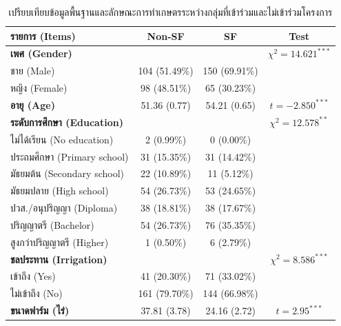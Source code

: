 \begin{table}[ht]
\centering
\small
\setlength{\tabcolsep}{4pt}
\renewcommand{\arraystretch}{1.1}
\caption{เปรียบเทียบข้อมูลพื้นฐานและลักษณะการทำเกษตรระหว่างกลุ่มที่เข้าร่วมและไม่เข้าร่วมโครงการ}
\label{tab:descriptive}

\begin{tabular}{lccc}
\hline
\textbf{รายการ (Items)} & \textbf{Non-SF} & \textbf{SF} & \textbf{Test} \\
\hline

\textbf{เพศ (Gender)} & & & $\chi^2 = 14.621^{***}$ \\
ชาย (Male) & 104 (51.49\%) & 150 (69.91\%) & \\
หญิง (Female) & 98 (48.51\%) & 65 (30.23\%) & \\

\textbf{อายุ (Age)} & 51.36 (0.77) & 54.21 (0.65) & $t = -2.850^{***}$ \\

\textbf{ระดับการศึกษา (Education)} & & & $\chi^2 = 12.578^{**}$ \\
ไม่ได้เรียน (No education) & 2 (0.99\%) & 0 (0.00\%) & \\
ประถมศึกษา (Primary school) & 31 (15.35\%) & 31 (14.42\%) & \\
มัธยมต้น (Secondary school) & 22 (10.89\%) & 11 (5.12\%) & \\
มัธยมปลาย (High school) & 54 (26.73\%) & 53 (24.65\%) & \\
ปวส./อนุปริญญา (Diploma) & 38 (18.81\%) & 38 (17.67\%) & \\
ปริญญาตรี (Bachelor) & 54 (26.73\%) & 76 (35.35\%) & \\
สูงกว่าปริญญาตรี (Higher) & 1 (0.50\%) & 6 (2.79\%) & \\

\textbf{ชลประทาน (Irrigation)} & & & $\chi^2 = 8.586^{***}$ \\
เข้าถึง (Yes) & 41 (20.30\%) & 71 (33.02\%) & \\
ไม่เข้าถึง (No) & 161 (79.70\%) & 144 (66.98\%) & \\

\textbf{ขนาดฟาร์ม (ไร่)} & 37.81 (3.78) & 24.16 (2.72) & $t = 2.95^{***}$ \\

\hline
\end{tabular}
\end{table}


